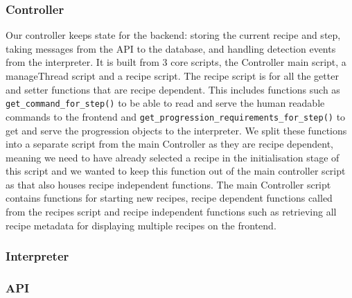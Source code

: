\documentclass{article}
\begin{document}
    \subsubsection{Controller}
    Our controller keeps state for the backend: storing the current recipe and step, taking messages from the API to the database, and handling detection events from the interpreter. It is built from 3 core scripts, the Controller main script, a manageThread script and a recipe script. 
    The recipe script is for all the getter and setter functions that are recipe dependent. This includes functions such as \verb|get_command_for_step()| to be able to read and serve the human readable commands to the frontend and \verb|get_progression_requirements_for_step()| to get and serve the progression objects to the interpreter. We split these functions into a separate script from the main Controller as they are recipe dependent, meaning we need to have already selected a recipe in the initialisation stage of this script and we wanted to keep this function out of the main controller script as that also houses recipe independent functions.
    The main Controller script contains functions for starting new recipes, recipe dependent functions called from the recipes script and recipe independent functions such as retrieving all recipe metadata for displaying multiple recipes on the frontend.
    \subsubsection{Interpreter}
    \subsubsection{API}
\end{document}
